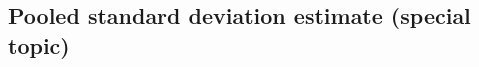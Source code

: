 %
%
%


\subsection{Pooled standard deviation estimate (special topic)}
\label{pooledStandardDeviations}

